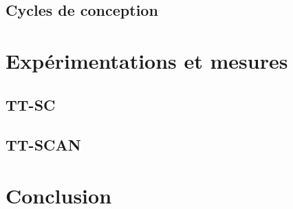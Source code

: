 \subsection{Cycles de conception}

\section{Expérimentations et mesures}

\subsection{TT-SC}
\subsection{TT-SCAN}


\section*{Conclusion}


